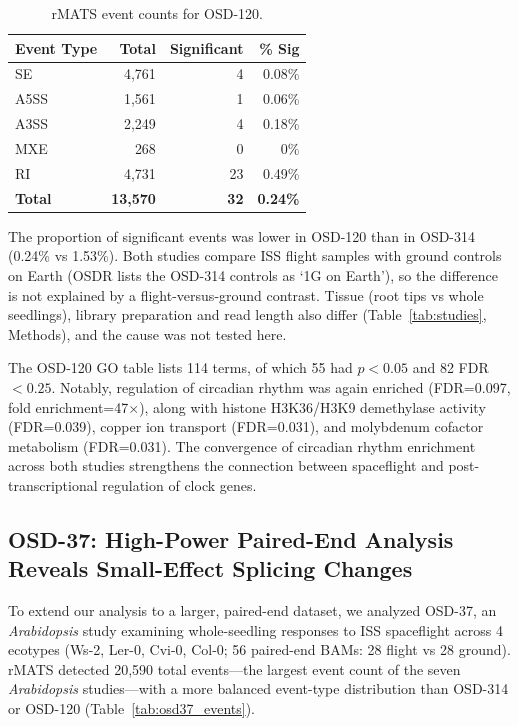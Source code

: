 \documentclass[12pt,a4paper]{article}
\begin{document}
\begin{table}[h]
\centering
\caption{rMATS event counts for OSD-120.}
\label{tab:osd120_events}
\begin{tabular}{lrrr}
\toprule
\textbf{Event Type} & \textbf{Total} & \textbf{Significant} & \textbf{\% Sig} \\
\midrule
SE & 4,761 & 4 & 0.08\% \\
A5SS & 1,561 & 1 & 0.06\% \\
A3SS & 2,249 & 4 & 0.18\% \\
MXE & 268 & 0 & 0\% \\
RI & 4,731 & 23 & 0.49\% \\
\textbf{Total} & \textbf{13,570} & \textbf{32} & \textbf{0.24\%} \\
\bottomrule
\end{tabular}
\end{table}

The proportion of significant events was lower in OSD-120 than in OSD-314 (0.24\% vs 1.53\%). Both studies compare ISS flight samples with ground controls on Earth (OSDR lists the OSD-314 controls as `1G on Earth'), so the difference is not explained by a flight-versus-ground contrast. Tissue (root tips vs whole seedlings), library preparation and read length also differ (Table~\ref{tab:studies}, Methods), and the cause was not tested here.

The OSD-120 GO table lists 114 terms, of which 55 had $p<0.05$ and 82 FDR$<0.25$. Notably, regulation of circadian rhythm was again enriched (FDR=0.097, fold enrichment=47$\times$), along with histone H3K36/H3K9 demethylase activity (FDR=0.039), copper ion transport (FDR=0.031), and molybdenum cofactor metabolism (FDR=0.031). The convergence of circadian rhythm enrichment across both studies strengthens the connection between spaceflight and post-transcriptional regulation of clock genes.

\subsection{OSD-37: High-Power Paired-End Analysis Reveals Small-Effect Splicing Changes}

To extend our analysis to a larger, paired-end dataset, we analyzed OSD-37, an \textit{Arabidopsis} study examining whole-seedling responses to ISS spaceflight across 4 ecotypes (Ws-2, Ler-0, Cvi-0, Col-0; 56 paired-end BAMs: 28 flight vs 28 ground). rMATS detected 20,590 total events---the largest event count of the seven \textit{Arabidopsis} studies---with a more balanced event-type distribution than OSD-314 or OSD-120 (Table~\ref{tab:osd37_events}).
\end{document}
